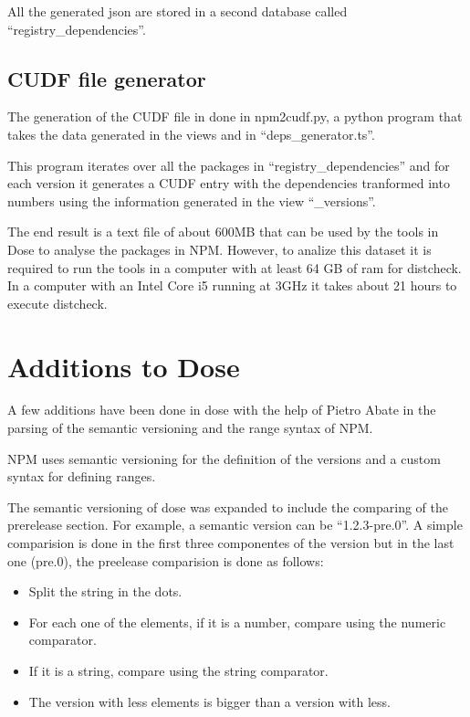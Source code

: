 \documentclass[letterpaper,12pt]{report}
\begin{document}
All the generated json are stored in a second database called
``registry\_dependencies''.



\subsection{CUDF file generator}

The generation of the CUDF file in done in npm2cudf.py, a python program that
takes the data generated in the views and in ``deps\_generator.ts''.

This program iterates over all the packages in ``registry\_dependencies'' and
for each version it generates a CUDF entry with the dependencies tranformed into
numbers using the information generated in the view ``\_versions''.

The end result is a text file of about 600MB that can be used by the tools in
Dose to analyse the packages in NPM. However, to analize this dataset it is
required to run the tools in a computer with at least 64 GB of ram for
distcheck. In a computer with an Intel Core i5 running at 3GHz it takes about 21
hours to execute distcheck.


\section{Additions to Dose}

A few additions have been done in dose with the help of Pietro Abate in the
parsing of the semantic versioning and the range syntax of NPM.

NPM uses semantic versioning for the definition of the versions and a custom
syntax for defining ranges.

The semantic versioning of dose was expanded to include the comparing of the
prerelease section. For example, a semantic version can be ``1.2.3-pre.0''. A
simple comparision is done in the first three componentes of the version but in
the last one (pre.0), the preelease comparision is done as follows:

\begin{itemize}
  \item Split the string in the dots.
  \item For each one of the elements, if it is a number, compare using the
    numeric comparator.
  \item If it is a string, compare using the string comparator.
  \item The version with less elements is bigger than a version with less.
\end{itemize}
\end{document}
